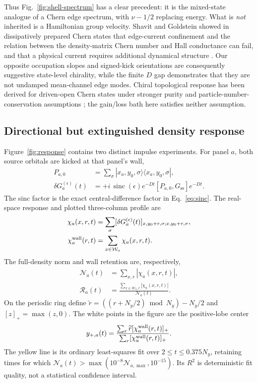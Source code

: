\documentclass[aps,prb,twocolumn,nofootinbib,superscriptaddress,floatfix]{revtex4-2}
\newcommand{\Gss}{G_{\mathrm{ss}}}
\begin{document}
Thus Fig.~\ref{fig:shell-spectrum} has a clear precedent: it is the mixed-state
analogue of a Chern edge spectrum, with $\nu-1/2$ replacing energy. What is
\emph{not} inherited is a Hamiltonian group velocity. Shavit and Goldstein
showed in dissipatively prepared Chern states that edge-current confinement and
the relation between the density-matrix Chern number and Hall conductance can
fail, and that a physical current requires additional dynamical structure
\cite{Shavit2020}. Our opposite occupation slopes and signed-kick orientations
are consequently suggestive state-level chirality, while the finite $D$ gap
demonstrates that they are not undamped mean-channel edge modes. Chiral
topological response has been derived for driven-open Chern states under
stronger purity and particle-number-conservation assumptions
\cite{Tonielli2020}; the gain/loss bath here satisfies neither assumption.

\subsection{Directional but extinguished density response}

Figure~\ref{fig:response} contains two distinct impulse experiments. For panel
$a$, both source orbitals are kicked at that panel's wall,
\begin{align}
 P_{a,0}&=\sum_\sigma|x_a,y_0,\sigma\rangle
 \langle x_a,y_0,\sigma|,\nonumber\\
 \delta G_a^{(\epsilon)}(t)&=+i\,\operatorname{sinc}(\epsilon)
 e^{-Dt}[P_{a,0},\Gss]e^{-Dt}.
 \label{eq:wallkick}
\end{align}
The sinc factor is the exact central-difference factor in
Eq.~\eqref{eq:sinc}. The real-space response and plotted three-column profile
are
\begin{align}
 \chi_a(x,r,t)&=\sum_\sigma
 [\delta G_a^{(\epsilon)}(t)]_{x,y_0+r,\sigma;x,y_0+r,\sigma},\nonumber\\
 \chi_a^{\rm wall}(r,t)&=\sum_{x\in\mathcal W_a}\chi_a(x,r,t).
 \label{eq:wallprofile}
\end{align}
The full-density norm and wall retention are, respectively,
\begin{align}
 \mathcal N_a(t)&=\sum_{x,r}|\chi_a(x,r,t)|,\nonumber\\
 \mathcal R_a(t)&=\frac{\sum_{x\in\mathcal W_a,r}|\chi_a(x,r,t)|}
 {\mathcal N_a(t)}.
 \label{eq:normretention}
\end{align}
On the periodic ring define
$\widetilde r=((r+N_y/2)\bmod N_y)-N_y/2$ and $[z]_+=\max(z,0)$.
The white points in the figure are the positive-lobe center
\begin{equation}
 y_{+,a}(t)=\frac{\sum_r\widetilde r[\chi_a^{\rm wall}(r,t)]_+}
 {\sum_r[\chi_a^{\rm wall}(r,t)]_+}.
 \label{eq:positivecenter}
\end{equation}
The yellow line is its ordinary least-squares fit over
$2\le t\le0.375N_y$, retaining times for which
$\mathcal N_a(t)>\max(10^{-8}\mathcal N_{a,\max},10^{-15})$. Its $R^2$ is
deterministic fit quality, not a statistical confidence interval.
\end{document}
